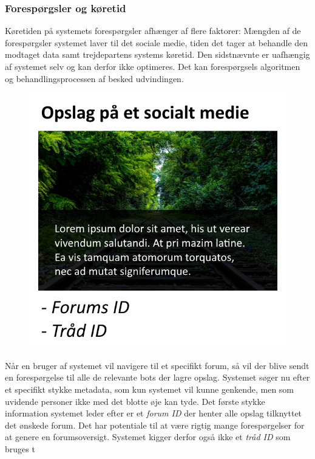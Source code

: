 \subsubsection{Forespørgsler og køretid}
Køretiden på systemets forespørgsler afhænger af flere faktorer: Mængden af de forespørgsler systemet laver til det sociale medie, tiden det tager at behandle den modtaget data samt trejdepartens systems køretid. Den sidstnævnte er uafhængig af systemet selv og kan derfor ikke optimeres. Det kan forespørgsels algoritmen og behandlingsprocessen af besked udvindingen. 

\begin{figure}[H]
    \centering
    \includegraphics[width=0.5\linewidth]{Projectdoc/Assets/Illustrationer/requests.png}
    \caption{}
    \label{fig:køretid}
\end{figure}

Når en bruger af systemet vil navigere til et specifikt forum, så vil der blive sendt en forespørgelse til alle de relevante bots der lagre opslag. Systemet søger nu efter et specifikt stykke metadata, som kun systemet vil kunne genkende, men som uvidende personer ikke med det blotte øje kan tyde. Det første stykke information systemet leder efter er et \textit{forum ID} der henter alle opslag tilknyttet det ønskede forum. Det har potentiale til at være rigtig mange forespørgelser for at genere en forumsoversigt. Systemet kigger derfor også ikke et \textit{tråd ID} som bruges t


